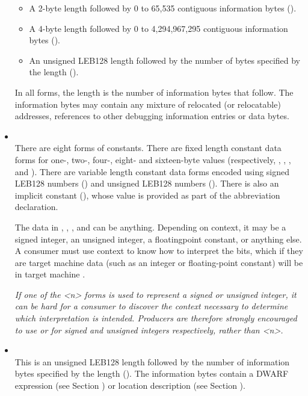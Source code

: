 \begin{itemize}
\begin{itemize}
\item
A 2-byte length followed by 0 to 65,535 contiguous information
bytes (\DWFORMblocktwoTARG).

\item
A 4-byte length followed by 0 to 4,294,967,295 contiguous
information bytes (\DWFORMblockfourTARG).

\item
An unsigned LEB128
length followed by the number of bytes
specified by the length (\DWFORMblockTARG).
\end{itemize}

In all forms, the length is the number of information bytes
that follow. The information bytes may contain any mixture
of relocated (or relocatable) addresses, references to other
debugging information entries or data bytes.

\item \CLASSconstant \\
There are eight forms of constants. There are fixed length
constant data forms for one-, two-, four-, eight- and sixteen-byte values
(respectively, 
\DWFORMdataoneTARG, 
\DWFORMdatatwoTARG, 
\DWFORMdatafourTARG,
\DWFORMdataeightTARG{} and
\DWFORMdatasixteenTARG). 
There are variable length constant
data forms encoded using 
signed LEB128 numbers (\DWFORMsdataTARG) and unsigned 
LEB128 numbers (\DWFORMudataTARG).
There is also an implicit constant (\DWFORMimplicitconst),
whose value is provided as part of the abbreviation
declaration.

The data in \DWFORMdataone, 
\DWFORMdatatwo, 
\DWFORMdatafour{}, 
\DWFORMdataeight{} and
\DWFORMdatasixteen{} 
can be anything. Depending on context, it may
be a signed integer, an unsigned integer, a floating\dash point
constant, or anything else. A consumer must use context to
know how to interpret the bits, which if they are target
machine data (such as an integer or floating-point constant)
will be in target machine \byteorder.

\textit{If one of the \DWFORMdataTARG\textless n\textgreater 
forms is used to represent a
signed or unsigned integer, it can be hard for a consumer
to discover the context necessary to determine which
interpretation is intended. Producers are therefore strongly
encouraged to use \DWFORMsdata{} or 
\DWFORMudata{} for signed and
unsigned integers respectively, rather than 
\DWFORMdata\textless n\textgreater.}

\item \CLASSexprloc \\
This is an unsigned LEB128 length 
followed by the number of information bytes specified by the 
length (\DWFORMexprlocTARG). 
The information bytes contain a DWARF expression 
(see Section ) 
or location description 
(see Section ).


\end{itemize}
